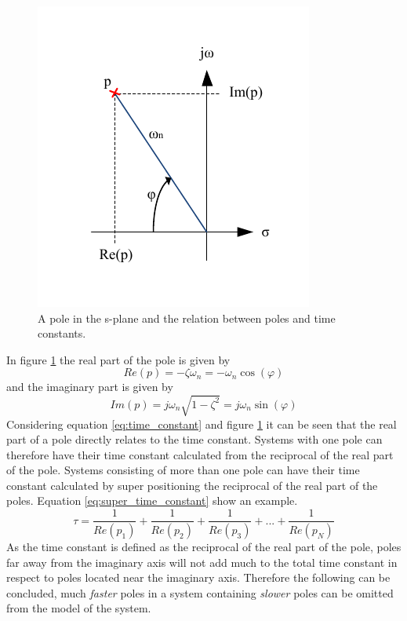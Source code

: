 \begin{figure}[htb]
	\centering
	\includegraphics[scale=1,clip,trim=0 20 0 20]{graphics/splane.pdf} %
	\caption{A pole in the s-plane and the relation between poles and time constants.}
	\label{fig:s_plane}			%
\end{figure}
In figure \ref{fig:s_plane} the real part of the pole is given by 
\begin{equation}
	Re(p) = - \zeta\omega_{n} = - \omega_{n} \cos(\varphi)
\end{equation}
and the imaginary part is given by
\begin{equation}
	Im(p) = j\omega_{n}\sqrt{1 - \zeta^{2}} = j\omega_{n}\sin(\varphi)
\end{equation}
Considering equation \ref{eq:time_constant} and figure \ref{fig:s_plane} it can be seen that the real part of a pole directly relates to the time constant. Systems with one pole can therefore have their time constant calculated from the reciprocal of the real part of the pole. Systems consisting of more than one pole can have their time constant calculated by super positioning the reciprocal of the real part of the poles. Equation \ref{eq:super_time_constant} show an example.
\begin{equation}
	\tau = \frac{1}{Re(p_{1})} + \frac{1}{Re(p_{2})} + \frac{1}{Re(p_{3})} + ... + \frac{1}{Re(p_{N})}\label{eq:super_time_constant}
\end{equation}
As the time constant is defined as the reciprocal of the real part of the pole, poles far away from the imaginary axis will not add much to the total time constant in respect to poles located near the imaginary axis. Therefore the following can be concluded, much \textit{faster} poles in a system containing \textit{slower} poles can be omitted from the model of the system.

